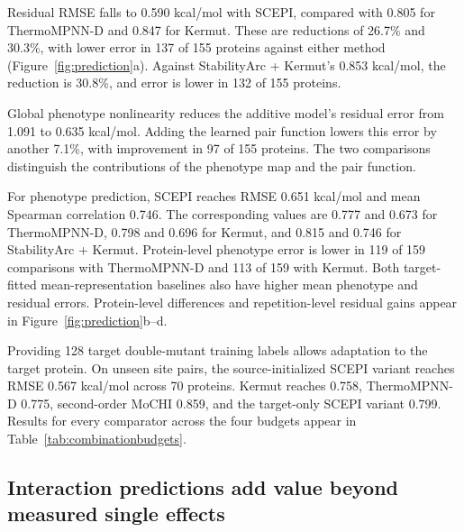 \documentclass{llncs}
\begin{document}
Residual RMSE falls to 0.590 kcal/mol with SCEPI, compared with 0.805 for ThermoMPNN-D and 0.847 for Kermut. These are reductions of 26.7\% and 30.3\%, with lower error in 137 of 155 proteins against either method (Figure~\ref{fig:prediction}a). Against StabilityArc + Kermut's 0.853 kcal/mol, the reduction is 30.8\%, and error is lower in 132 of 155 proteins.

Global phenotype nonlinearity reduces the additive model's residual error from 1.091 to 0.635 kcal/mol. Adding the learned pair function lowers this error by another 7.1\%, with improvement in 97 of 155 proteins. The two comparisons distinguish the contributions of the phenotype map and the pair function.

For phenotype prediction, SCEPI reaches RMSE 0.651 kcal/mol and mean Spearman correlation 0.746. The corresponding values are 0.777 and 0.673 for ThermoMPNN-D, 0.798 and 0.696 for Kermut, and 0.815 and 0.746 for StabilityArc + Kermut. Protein-level phenotype error is lower in 119 of 159 comparisons with ThermoMPNN-D and 113 of 159 with Kermut. Both target-fitted mean-representation baselines also have higher mean phenotype and residual errors. Protein-level differences and repetition-level residual gains appear in Figure~\ref{fig:prediction}b--d.

Providing 128 target double-mutant training labels allows adaptation to the target protein. On unseen site pairs, the source-initialized SCEPI variant reaches RMSE 0.567 kcal/mol across 70 proteins. Kermut reaches 0.758, ThermoMPNN-D 0.775, second-order MoCHI 0.859, and the target-only SCEPI variant 0.799. Results for every comparator across the four budgets appear in Table~\ref{tab:combinationbudgets}.

\subsection{Interaction predictions add value beyond measured single effects}
\end{document}
